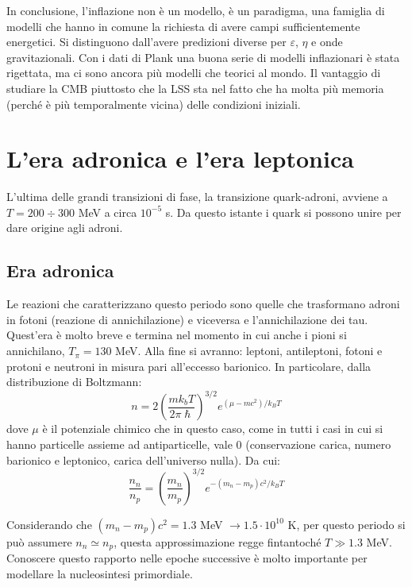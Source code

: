 \vspace{1em}
In conclusione, l'inflazione non è un modello, è un paradigma, una famiglia di modelli che hanno in comune la richiesta di avere campi sufficientemente energetici. Si distinguono dall'avere predizioni diverse per $\varepsilon$, $\eta$ e onde gravitazionali. Con i dati di Plank una buona serie di modelli inflazionari è stata rigettata, ma ci sono ancora più modelli che teorici al mondo. Il vantaggio di studiare la CMB piuttosto che la LSS sta nel fatto che ha molta più memoria (perché è più temporalmente vicina) delle condizioni iniziali. 


\section{L’era adronica e l’era leptonica}
L'ultima delle grandi transizioni di fase, la transizione quark-adroni, avviene a $T=200\div 300$ MeV a circa $10^{-5}$ s. Da questo istante i quark si possono unire per dare origine agli adroni. 

\subsection{Era adronica}
Le reazioni che caratterizzano questo periodo sono quelle che trasformano adroni in fotoni (reazione di annichilazione) e viceversa e l'annichilazione dei tau. Quest'era è molto breve e termina nel momento in cui anche i pioni si annichilano, $T_\pi = 130$ MeV. Alla fine si avranno: leptoni, antileptoni, fotoni e protoni e neutroni in misura pari all'eccesso barionico. In particolare, dalla distribuzione di Boltzmann:
\begin{equation}
    n=2\left(\frac{mk_b T}{2\pi \hslash}\right)^{3/2}  e^{(\mu - mc^2)/{k_B T}} \label{eq:boltzmann}
\end{equation}
dove $\mu$ è il potenziale chimico che in questo caso, come in tutti i casi in cui si hanno particelle assieme ad antiparticelle, vale $0$ (conservazione carica, numero barionico e leptonico, carica dell'universo nulla). Da cui:
\begin{equation}
    \frac{n_n}{n_p}=\left(\frac{m_n}{m_p} \right)^{3/2}e^{-(m_n-m_p)c^2 / k_B T} \label{eq:nn-vs-np}
\end{equation}

Considerando che $(m_n-m_p)c^2=1.3$ MeV $\rightarrow 1.5\cdot 10^{10}$ K, per questo periodo si può assumere $n_n\simeq n_p$, questa approssimazione regge fintantoché $T\gg 1.3$ MeV. Conoscere questo rapporto nelle epoche successive è molto importante per modellare la nucleosintesi primordiale.


